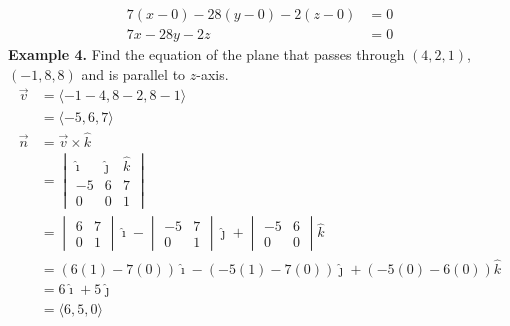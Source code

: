 \documentclass{report}
\begin{document}
\begin{align*}
    7(x - 0) - 28(y - 0) - 2(z - 0) & = 0 \\
    7x - 28y - 2z                   & = 0
\end{align*}
\newpage
\noindent\textbf{Example 4. } Find the equation of the plane that passes through $(4, 2, 1)$, $(-1, 8, 8)$ and is parallel to $z$-axis.
\begin{align*}
    \vec{v} & = \langle -1 - 4, 8 - 2, 8 - 1 \rangle                                           \\
            & = \langle -5, 6, 7 \rangle                                                       \\
    \vec{n} & = \vec{v} \times \hat{k}                                                         \\
            & = \begin{vmatrix}
                    \hat{\imath} & \hat{\jmath} & \hat{k} \\
                    -5           & 6            & 7       \\
                    0            & 0            & 1
                \end{vmatrix}                     \\
            & = \begin{vmatrix}
                    6 & 7 \\
                    0 & 1
                \end{vmatrix}\hat{\imath} - \begin{vmatrix}
                                                -5 & 7 \\
                                                0  & 1
                                            \end{vmatrix}\hat{\jmath} + \begin{vmatrix}
                                                                            -5 & 6 \\
                                                                            0  & 0
                                                                        \end{vmatrix}\hat{k}   \\
            & = (6(1) - 7(0))\hat{\imath} - (-5(1) - 7(0))\hat{\jmath} + (-5(0) - 6(0))\hat{k} \\
            & = 6\hat{\imath} + 5\hat{\jmath}                                                  \\
            & = \langle 6, 5, 0 \rangle
\end{align*}
\end{document}
